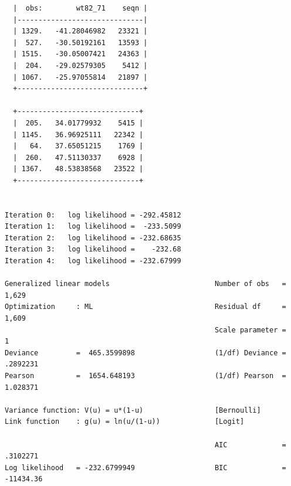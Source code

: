 \documentclass[
  10pt,
]{book}
\begin{document}
\begin{verbatim}
  |  obs:        wt82_71    seqn |
  |------------------------------|
  | 1329.   -41.28046982   23321 |
  |  527.   -30.50192161   13593 |
  | 1515.   -30.05007421   24363 |
  |  204.   -29.02579305    5412 |
  | 1067.   -25.97055814   21897 |
  +------------------------------+

  +-----------------------------+
  |  205.   34.01779932    5415 |
  | 1145.   36.96925111   22342 |
  |   64.   37.65051215    1769 |
  |  260.   47.51130337    6928 |
  | 1367.   48.53838568   23522 |
  +-----------------------------+


Iteration 0:   log likelihood = -292.45812  
Iteration 1:   log likelihood =  -233.5099  
Iteration 2:   log likelihood = -232.68635  
Iteration 3:   log likelihood =    -232.68  
Iteration 4:   log likelihood = -232.67999  

Generalized linear models                         Number of obs   =      1,629
Optimization     : ML                             Residual df     =      1,609
                                                  Scale parameter =          1
Deviance         =  465.3599898                   (1/df) Deviance =   .2892231
Pearson          =  1654.648193                   (1/df) Pearson  =   1.028371

Variance function: V(u) = u*(1-u)                 [Bernoulli]
Link function    : g(u) = ln(u/(1-u))             [Logit]

                                                  AIC             =   .3102271
Log likelihood   = -232.6799949                   BIC             =  -11434.36


\end{verbatim}
\end{document}

